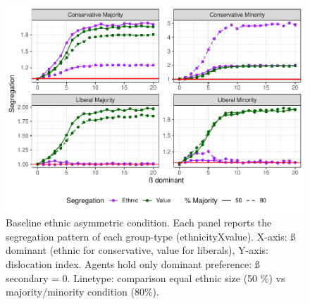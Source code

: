 \documentclass[
]{article}
\begin{document}
\begin{figure}[H]

{\centering \includegraphics{ev_rum_files/figure-latex/asm_dom-1} 

}

\caption{Baseline ethnic asymmetric condition. Each panel reports the segregation pattern of each group-type (ethnicityXvalue). X-axis: ß dominant (ethnic for conservative, value for liberals), Y-axis: dislocation index. Agents hold only dominant preference: ß secondary = 0. Linetype: comparison equal ethnic size (50 \%) vs majority/minority condition (80\%).}\label{fig:asm_dom}
\end{figure}
\end{document}
